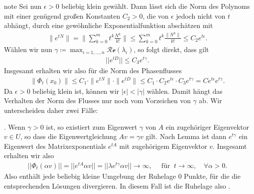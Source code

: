\documentclass[letterpaper,10pt,english]{jupyterBook}
\begin{document}
\begin{sphinxadmonition}{note}
\sphinxAtStartPar
Sei nun \(\epsilon > 0\) beliebig klein gewählt.
Dann lässt sich die Norm des Polynoms mit einer genügend großen Konstanten \(C_2 > 0\), die von \(\epsilon\) jedoch nicht von \(t\) abhängt, durch eine gewöhnliche Exponentialfunktion abschätzen mit
\begin{equation*}
\begin{split} \|e^{tN}\| = \| \sum_{k=0}^m t^k\frac{N^k}{k!} \| \leq \sum_{k=0}^m t^k \frac{\|N^k\|}{k!} \leq C_2  e^{t \epsilon}.\end{split}
\end{equation*}
\sphinxAtStartPar
Wählen wir nun \(\gamma \coloneqq \max_{i=1,\dots,n} \mathcal{Re}(\lambda_i)\), so folgt direkt, dass gilt
\begin{equation*}
\begin{split}||e^{tD}|| \leq C_3 e^{t\gamma}.\end{split}
\end{equation*}
\sphinxAtStartPar
Insgesamt erhalten wir also für die Norm des Phasenflusses
\begin{equation}\label{equation:ode_stability/ruhelagen:eq:abschaetzung_ew}
\begin{split}\|\Phi_t(x_0)\| \leq C_1 \cdot \|e^{tN}\| \cdot \|e^{tD}\| \leq C_1 \cdot C_2 e^{t \epsilon} \cdot C_3 e^{t\gamma} = C e^{t \epsilon} e^{t\gamma}.\end{split}
\end{equation}
\sphinxAtStartPar
Da \(\epsilon > 0\) beliebig klein ist, können wir \(|\epsilon| < |\gamma|\) wählen.
Damit hängt das Verhalten der Norm des Flusses nur noch vom Vorzeichen von \(\gamma\) ab.
Wir unterscheiden daher zwei Fälle:

. Wenn \(\gamma >0\) ist, so existiert zum Eigenwert \(\gamma\) von \(A\) ein zugehöriger Eigenvektor \(v\in U\), so dass die Eigenwertgleichung \(A v = \gamma v\) gilt.
Nach Lemma {\hyperref[\detokenize{ode/repetition:lem:mpotew}]{}} ist dann \(e^{t\gamma}\) ein Eigenwert des Matrixexponentials \(e^{tA}\) mit zugehörigem Eigenvektor \(v\).
Insgesamt erhalten wir also
\begin{equation*}
\begin{split}||\Phi_t(\alpha v)|| = ||e^{tA}\alpha v|| = ||\lambda e^{t\gamma} \alpha v|| \to \infty, \quad \text{ für } \ t \to \infty, \quad  \forall \alpha>0. \end{split}
\end{equation*}
\sphinxAtStartPar
Also enthält jede beliebig kleine Umgebung der Ruhelage \(0\) Punkte, für die die entsprechenden Lösungen divergieren.
In diesem Fall ist die Ruhelage also .


\end{sphinxadmonition}
\end{document}
